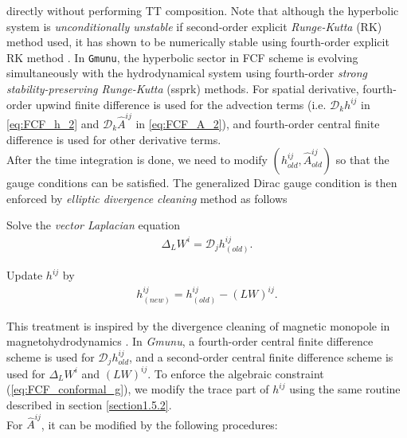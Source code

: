 directly without performing TT composition.
Note that although the hyperbolic system is \textit{unconditionally unstable} if second-order explicit \textit{Runge-Kutta} (RK) method used,
it has shown to be numerically stable using fourth-order explicit RK method \cite{cordero2012partially,shibata2015numerical}.
In \texttt{Gmunu}, the hyperbolic sector in FCF scheme is evolving simultaneously with the hydrodynamical system using 
fourth-order \textit{strong stability-preserving Runge-Kutta} (ssprk) methods.
For spatial derivative, fourth-order upwind finite difference is used for the advection terms \cite{shibata2015numerical}
(i.e. $\mathcal{D}_k h^{ij}$ in \cref{eq:FCF_h_2} and $\mathcal{D}_k \hat{A}^{ij}$ in \cref{eq:FCF_A_2}),
and fourth-order central finite difference is used for other derivative terms.\\
After the time integration is done,
we need to modify $\left(h^{ij}_{old}, \hat{A}^{ij}_{old}\right)$ so that the gauge conditions can be satisfied.
The generalized Dirac gauge condition is then enforced by \textit{elliptic divergence cleaning} method as follows
\begin{Step}
    \item Solve the \textit{vector Laplacian} equation
    \begin{align}
        \Delta_L W^i = \mathcal{D}_j h^{ij}_{(old)}.
    \end{align}
    \item Update $h^{ij}$ by
    \begin{align}
        h^{ij}_{(new)} = h^{ij}_{(old)} - \left( L W \right)^{ij}.
    \end{align}
\end{Step}
This treatment is inspired by the divergence cleaning of magnetic monopole in magnetohydrodynamics \cite{balsara2004comparison,teunissen2019geometric,balsara1998total}.
In \textit{Gmunu}, a fourth-order central finite difference scheme is used for $\mathcal{D}_j h^{ij}_{old}$,
and a second-order central finite difference scheme is used for $\Delta_L W^i$ and $\left( L W \right)^{ij}$.
To enforce the algebraic constraint (\ref{eq:FCF_conformal_g}),
we modify the trace part of $h^{ij}$ using the same routine described in section \ref{section1.5.2}.\\
For $\hat{A}^{ij}$, it can be modified by the following procedures:
